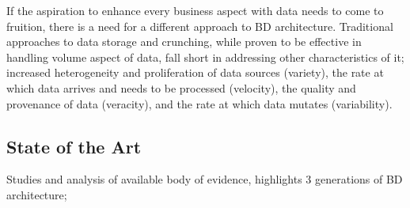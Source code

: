 \documentclass[runningheads]{llncs}
\begin{document}
If the aspiration to enhance every business aspect with data needs to come to fruition, there is a need for a different approach to BD architecture. Traditional approaches to data storage and crunching, while proven to be effective in handling volume aspect of data, fall short in addressing other characteristics of it; increased heterogeneity and proliferation of data sources (variety), the rate at which data arrives and needs to be processed (velocity), the quality and provenance of data (veracity), and the rate at which data mutates (variability).

\subsection{State of the Art}

 Studies and analysis of available body of evidence, highlights 3 generations of BD architecture; 
\end{document}
